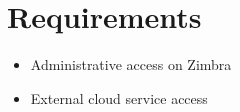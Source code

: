 \section{Requirements}
\begin{itemize}
    \item Administrative access on Zimbra
    \item External cloud service access
\end{itemize}